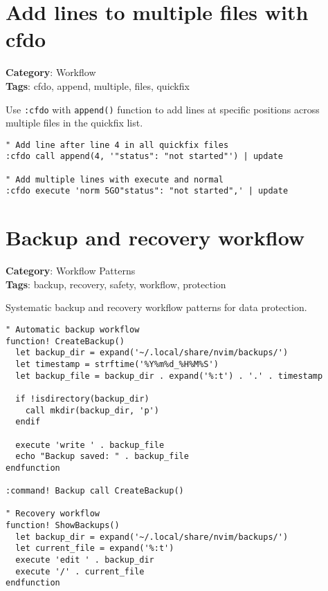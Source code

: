 {{{{{{{{{{{{{{{{{{\section{Add lines to multiple files with cfdo}

\textbf{Category}: Workflow\\ \textbf{Tags}: cfdo, append, multiple, files, quickfix
\vspace{0.5cm}

Use {\footnotesize \Verb§:cfdo§} with {\footnotesize \Verb§append()§} function to add lines at specific positions across multiple files in the quickfix list.

\begin{Exa*}{}
\begin{Verbatim}[fontsize=\footnotesize, breaklines, breakanywhere]
" Add line after line 4 in all quickfix files
:cfdo call append(4, '"status": "not started"') | update

" Add multiple lines with execute and normal
:cfdo execute 'norm 5GO"status": "not started",' | update
\end{Verbatim}
\end{Exa*}

\section{Backup and recovery workflow}

\textbf{Category}: Workflow Patterns\\ \textbf{Tags}: backup, recovery, safety, workflow, protection
\vspace{0.5cm}

Systematic backup and recovery workflow patterns for data protection.

\begin{Exa*}{}
\begin{Verbatim}[fontsize=\footnotesize, breaklines, breakanywhere]
" Automatic backup workflow
function! CreateBackup()
  let backup_dir = expand('~/.local/share/nvim/backups/')
  let timestamp = strftime('%Y%m%d_%H%M%S')
  let backup_file = backup_dir . expand('%:t') . '.' . timestamp
  
  if !isdirectory(backup_dir)
    call mkdir(backup_dir, 'p')
  endif
  
  execute 'write ' . backup_file
  echo "Backup saved: " . backup_file
endfunction

:command! Backup call CreateBackup()

" Recovery workflow
function! ShowBackups()
  let backup_dir = expand('~/.local/share/nvim/backups/')
  let current_file = expand('%:t')
  execute 'edit ' . backup_dir
  execute '/' . current_file
endfunction


\end{Verbatim}
\end{Exa*}}}}}}}}}}}}}}}}}}}
